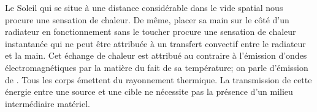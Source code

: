 \sk
Le Soleil qui se situe à une distance considérable dans le vide spatial nous procure une sensation de chaleur. De même, placer sa main sur le côté d'un radiateur en fonctionnement sans le toucher procure une sensation de chaleur instantanée qui ne peut être attribuée à un transfert convectif entre le radiateur et la main. Cet échange de chaleur est attribué au contraire à l'émission d'ondes électromagnétiques par la matière du fait de sa température; on parle d'émission de . Tous les corps émettent du rayonnement thermique. La transmission de cette énergie entre une source et une cible ne nécessite pas la présence d'un milieu intermédiaire matériel. 
